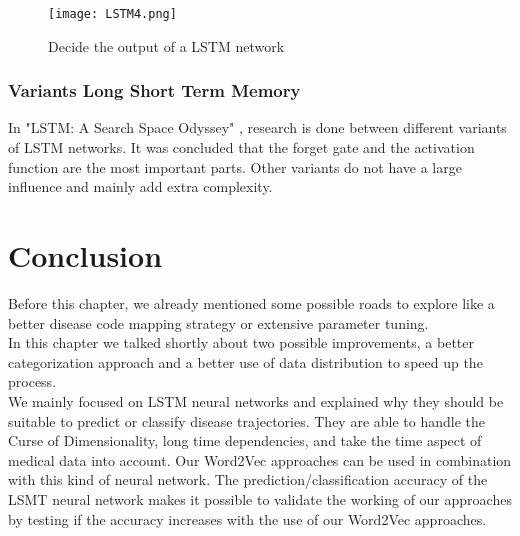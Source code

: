 \begin{figure}[!htb]
	\centering
	\texttt{[image: LSTM4.png]}
	\caption{Decide the output of a LSTM network \cite{lstmGood:online}}
	\label{fig:LSTM4}
\end{figure} 


\subsubsection{Variants Long Short Term Memory}

In "LSTM: A Search Space Odyssey" \cite{lstmSpace:article}, research is done between different variants of LSTM networks. It was concluded that the forget gate and the activation function are the most important parts. Other variants do not have a large influence and mainly add extra complexity.


\section{Conclusion}

Before this chapter, we already mentioned some possible roads to explore like a better disease code mapping strategy or extensive parameter tuning. \\

In this chapter we talked shortly about two possible improvements, a better categorization approach and a better use of data distribution to speed up the process. \\
We mainly focused on LSTM neural networks and explained why they should be suitable to predict or classify disease trajectories. They are able to handle the Curse of Dimensionality, long time dependencies, and take the time aspect of medical data into account. Our Word2Vec approaches can be used in combination with this kind of neural network. The prediction/classification accuracy of the LSMT neural network makes it possible to validate the working of our approaches by testing if the accuracy increases with the use of our Word2Vec approaches. \\


